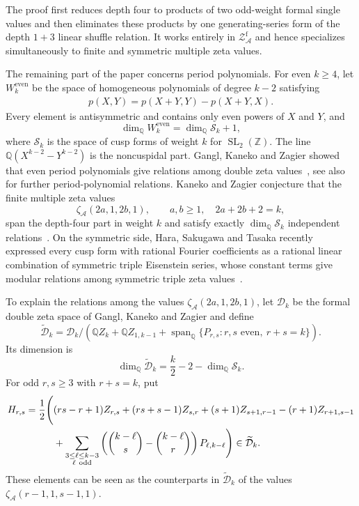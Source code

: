 \documentclass[12pt]{amsart}
\numberwithin{equation}{section}
\theoremstyle{plain}
\newcommand{\even}{\mathrm{even}}
\newcommand{\QQ}{\mathbb{Q}}
\newcommand{\ZZ}{\mathbb{Z}}
\DeclareMathOperator{\Span}{span}
\DeclareMathOperator{\SL}{SL}
\newcommand{\ZAf}{{\mathcal Z_{\mathcal A}^{\mathrm f}}}
\newcommand{\za}[1]{\zeta_{\mathcal A}(#1)}
\newcommand{\Dk}{\mathcal D_k}
\newcommand{\Dtk}{\widetilde{\mathcal D}_k}
\begin{document}
The proof first reduces depth four to products of two odd-weight formal single
values and then eliminates these products by one generating-series form of the
depth $1+3$ linear shuffle relation. It works entirely in $\ZAf$ and hence
specializes simultaneously to finite and symmetric multiple zeta values.

The remaining part of the paper concerns period polynomials. For even
$k\geq4$, let $W_k^{\even}$ be the space of homogeneous polynomials of degree
$k-2$ satisfying
\begin{align}\label{eq:even-period-polynomials}
 p(X,Y)=p(X+Y,Y)-p(X+Y,X).
\end{align}
Every element is antisymmetric and contains only even powers of $X$ and $Y$,
and
\[
 \dim_{\QQ}W_k^{\even}=\dim_{\QQ}\mathcal S_k+1,
\]
where $\mathcal S_k$ is the space of cusp forms of weight $k$ for
$\SL_2(\ZZ)$. The line $\QQ(X^{k-2}-Y^{k-2})$ is the noncuspidal part.
Gangl, Kaneko and Zagier showed that even period polynomials give relations
among double zeta values~\cite{GKZ}, see also~\cite{BS,Tasaka} for further
period-polynomial relations. Kaneko and Zagier conjecture that the
finite multiple zeta values
\[
 \za{2a,1,2b,1},\qquad a,b\geq1,\quad 2a+2b+2=k,
\]
span the depth-four part in weight $k$ and satisfy exactly
$\dim_{\QQ}\mathcal S_k$ independent relations~\cite{KZ}.
On the symmetric side, Hara, Sakugawa and Tasaka recently expressed
every cusp form with rational Fourier coefficients as a rational
linear combination of symmetric triple Eisenstein series, whose
constant terms give modular relations among symmetric triple zeta
values~\cite{HST}.

To explain the relations among the values $\za{2a,1,2b,1}$, let $\Dk$
be the formal double zeta space of
Gangl, Kaneko and Zagier and define
\[
 \Dtk=\Dk\big/\left(
 \QQ Z_k+\QQ Z_{1,k-1}
 +\Span_{\QQ}\{P_{r,s}:r,s\text{ even},\ r+s=k\}\right).
\]
Its dimension is
\[
 \dim_{\QQ}\Dtk=\frac{k}{2}-2-\dim_{\QQ}\mathcal S_k.
\]
For odd $r,s\geq3$ with $r+s=k$, put
\begin{align}\label{eq:H-source-element}
 H_{r,s}=\frac12\Bigg(&
 (rs-r+1)Z_{r,s}+(rs+s-1)Z_{s,r}
 +(s+1)Z_{s+1,r-1}-(r+1)Z_{r+1,s-1}\notag\\
 &+\sum_{\substack{3\leq\ell\leq k-3\\\ell\ \mathrm{odd}}}
 \left(\binom{k-\ell}{s}-\binom{k-\ell}{r}\right)
 P_{\ell,k-\ell}\Bigg)\in\Dtk.
\end{align}
These elements can be seen as the counterparts in $\Dtk$ of the values
$\zeta_{\mathcal A}(r-1,1,s-1,1)$.
\end{document}
